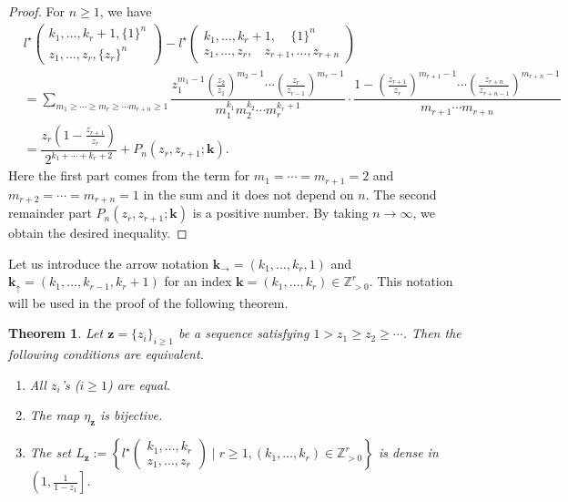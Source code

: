 \documentclass[12pt,a4paper]{article}
\newtheorem{thm}[defi]{Theorem}
\theoremstyle{remark}
\begin{document}
\begin{proof}
For $n\ge 1$, we have
\begin{align*}
&l^{\star}\begin{pmatrix}
k_1,\ldots, k_r+1, \{1\}^{n}\\
z_1,\ldots, z_r, \{z_{r}\}^n
\end{pmatrix}
- 
l^{\star}\begin{pmatrix}
k_1,\ldots, k_r+1, \ \ \ \ \ \{1\}^{n}\ \ \ \ \ \\
z_1, \ldots, z_r, \ \ \ \ z_{r+1}, \ldots ,z_{r+n}
\end{pmatrix}\\
&=
\sum_{m_1\ge \cdots \ge m_r \ge \cdots 
m_{r+n}\ge 1}
 \dfrac{z_1^{m_1-1} (\frac{z_2}{z_1})^{m_2-1}
 \cdots (\frac{z_r}{z_{r-1}})^{m_r-1} }
 {m_1^{k_1} m_2^{k_2}\cdots m_r^{k_r+1}  }
\cdot
 \dfrac{1- (\frac{z_{r+1}}{z_r})^{m_{r+1}-1} 
 \cdots (\frac{z_{r+n}}{z_{r+n-1}})^{m_{r+n}-1}
 }
 {m_{r+1}\cdots  m_{r+n} }\\
&=
\dfrac{z_r (1-\frac{z_{r+1}}{z_r})}
{2^{k_1+\cdots +k_r+2}}
+ P_n(z_r, z_{r+1};\boldsymbol{k}).
\end{align*}
Here the first part
comes from the term for 
$m_1=\cdots =m_{r+1}=2$ and $m_{r+2}=\cdots =m_{r+n}=1$
in the sum 
and it does not depend on $n$.
The second remainder part 
$P_n(z_r, z_{r+1};\boldsymbol{k})$ 
is a positive number.
By taking $n\to \infty$, 
we obtain the desired inequality.
\end{proof}


Let us introduce the arrow notation
$\boldsymbol{k}_{\rightarrow}
= (k_1,\ldots ,k_r, 1)$
and $\boldsymbol{k}_{\uparrow}
= (k_1,\ldots ,k_{r-1}, k_r+1)$
for an index $\boldsymbol{k}=(k_1,\ldots, k_r)\in 
\mathbb{Z}_{>0}^r$.
This notation will be used in the proof of the 
following theorem.



\begin{thm}\label{thm:mainthm_bijective}
Let $\boldsymbol{z}=\{z_i\}_{i\ge 1}$ be a sequence
satisfying $1>z_1\ge z_2 \ge \cdots $.
Then the following conditions are equivalent.
\begin{enumerate}
\item 
All $z_i$'s ($i\ge 1$) are equal.

\item 
The map $\eta_{\boldsymbol{z}}$ is bijective.

\item The set $L_{\boldsymbol{z}}:= 
\left\{  
l^{\star}\begin{pmatrix}
k_1,\ldots ,k_r\\
z_1, \ldots ,z_r
\end{pmatrix}  \mid r\ge 1, (k_1,\ldots, k_r) \in 
\mathbb{Z}_{>0}^{r} \right\}$
is dense in $\left(1, \tfrac{1}{1-z_1} \right]$.
\end{enumerate}
\end{thm}
\end{document}
